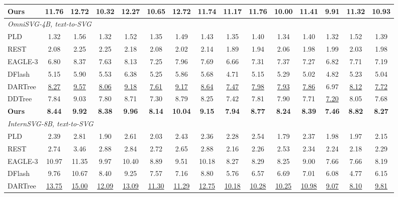 \begin{table}[t]
\begin{tabular*}{\textwidth}{@{\extracolsep{\fill}}l*{14}{c}@{}}
\textbf{Ours} & \textbf{11.76} & \textbf{12.72} & \textbf{10.32} & \textbf{12.27} & \textbf{10.65} & \textbf{12.72} & \textbf{11.74} & \textbf{11.17} & \textbf{11.76} & \textbf{10.00} & \textbf{11.41} & \textbf{9.91} & \textbf{11.32} & \textbf{10.93} \\
\midrule
\multicolumn{15}{l}{\textit{OmniSVG-4B, text-to-SVG}} \\
PLD & 1.32 & 1.56 & 1.32 & 1.52 & 1.35 & 1.49 & 1.43 & 1.35 & 1.40 & 1.34 & 1.40 & 1.32 & 1.52 & 1.39 \\
REST & 2.08 & 2.25 & 2.25 & 2.18 & 2.08 & 2.02 & 2.14 & 1.89 & 1.94 & 2.06 & 1.98 & 1.99 & 2.03 & 1.98 \\
EAGLE-3 & 6.80 & 8.37 & 7.63 & 8.13 & 7.25 & 7.96 & 7.69 & 6.66 & 7.31 & 7.37 & 7.27 & 6.82 & 7.71 & 7.19 \\
DFlash & 5.15 & 5.90 & 5.53 & 6.38 & 5.25 & 5.86 & 5.68 & 4.71 & 5.15 & 5.29 & 5.02 & 4.82 & 5.23 & 5.04 \\
DARTree & \underline{8.27} & \underline{9.57} & \underline{8.06} & \underline{9.18} & \underline{7.61} & \underline{9.17} & \underline{8.64} & \underline{7.47} & \underline{7.98} & \underline{7.93} & \underline{7.86} & 6.97 & \underline{8.12} & \underline{7.72} \\
DDTree & 7.84 & 9.03 & 7.80 & 8.71 & 7.30 & 8.79 & 8.25 & 7.42 & 7.81 & 7.90 & 7.71 & \underline{7.20} & 8.05 & 7.68 \\
\textbf{Ours} & \textbf{8.44} & \textbf{9.92} & \textbf{8.38} & \textbf{9.96} & \textbf{8.14} & \textbf{10.04} & \textbf{9.15} & \textbf{7.94} & \textbf{8.77} & \textbf{8.24} & \textbf{8.39} & \textbf{7.46} & \textbf{8.82} & \textbf{8.27} \\
\midrule
\multicolumn{15}{l}{\textit{InternSVG-8B, text-to-SVG}} \\
PLD & 2.39 & 2.81 & 1.90 & 2.61 & 2.03 & 2.43 & 2.36 & 2.28 & 2.54 & 1.79 & 2.37 & 1.98 & 1.97 & 2.15 \\
REST & 2.74 & 3.46 & 2.88 & 2.84 & 2.72 & 2.65 & 2.88 & 2.16 & 2.26 & 2.53 & 2.34 & 2.24 & 2.18 & 2.29 \\
EAGLE-3 & 10.97 & 11.35 & 9.97 & 10.40 & 8.89 & 9.51 & 10.18 & 8.27 & 8.29 & 8.25 & 9.00 & 7.66 & 7.66 & 8.19 \\
DFlash & 9.76 & 10.67 & 8.40 & 9.25 & 7.57 & 7.16 & 8.80 & 5.76 & 6.57 & 6.69 & 7.01 & 6.08 & 4.77 & 6.15 \\
DARTree & \underline{13.75} & \underline{15.00} & \underline{12.09} & \underline{13.09} & \underline{11.30} & \underline{11.29} & \underline{12.75} & \underline{10.18} & \underline{10.28} & \underline{10.25} & \underline{10.98} & \underline{9.07} & \underline{8.10} & \underline{9.81} \\

\end{tabular*}
\end{table}
